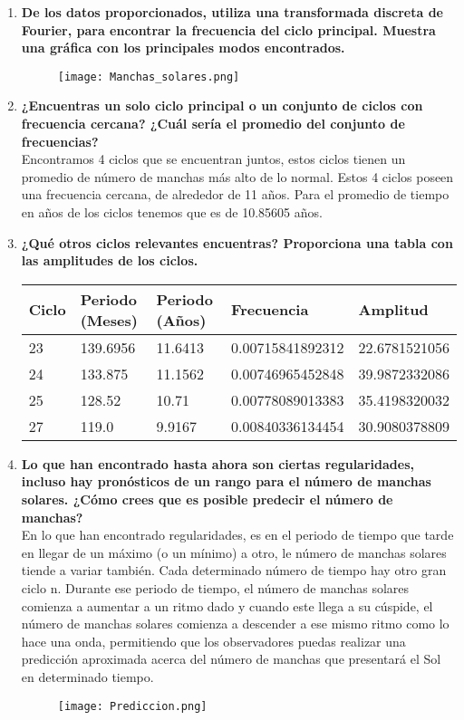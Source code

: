 \documentclass{article}
\begin{document}
\pagebreak
\onehalfspacing
\begin{enumerate}
\item \textbf{De los datos proporcionados, utiliza una transformada discreta de Fourier, para encontrar la frecuencia del ciclo principal. Muestra una gráfica con los principales modos encontrados.}
\begin{figure}[h]
\centering
\texttt{[image: Manchas\_solares.png]}
\end{figure}

\item \textbf{¿Encuentras un solo ciclo principal o un conjunto de ciclos con frecuencia cercana? ¿Cuál sería el promedio del conjunto de frecuencias?}\\
Encontramos 4 ciclos que se encuentran juntos, estos ciclos tienen un promedio de número de manchas más alto de lo normal. Estos 4 ciclos poseen una frecuencia cercana, de alrededor de 11 años. Para el promedio de tiempo en años de los ciclos tenemos que es de 10.85605 años. \\

\item \textbf{¿Qué otros ciclos relevantes encuentras? Proporciona una tabla con las amplitudes de los ciclos.}\\
\begin{table}[h]
\centering
\label{my-label}
\begin{tabular}{|l|l|l|l|l|}
\hline
Ciclo & Periodo (Meses) & Periodo (Años) & Frecuencia       & Amplitud      \\ \hline
23    & 139.6956        & 11.6413        & 0.00715841892312 & 22.6781521056 \\ \hline
24    & 133.875         & 11.1562        & 0.00746965452848 & 39.9872332086 \\ \hline
25    & 128.52          & 10.71          & 0.00778089013383 & 35.4198320032 \\ \hline
27    & 119.0           & 9.9167         & 0.00840336134454 & 30.9080378809 \\ \hline
\end{tabular}
\end{table}

\item \textbf{Lo que han encontrado hasta ahora son ciertas regularidades, incluso hay pronósticos de un rango para el número de manchas solares. ¿Cómo crees que es posible predecir el número de manchas?}\\
En lo que han encontrado regularidades, es en el periodo de tiempo que tarde en llegar de un máximo (o un mínimo) a otro, le número de manchas solares tiende a variar también. Cada determinado número de tiempo hay otro gran ciclo n. Durante ese periodo de tiempo, el número de manchas solares comienza a aumentar a un ritmo dado y cuando este llega a su cúspide, el número de manchas solares comienza a descender a ese mismo ritmo como lo hace una onda, permitiendo que los observadores puedas realizar una predicción aproximada acerca del número de manchas que presentará el Sol en determinado tiempo.
\begin{figure}[h]
\texttt{[image: Prediccion.png]}
\end{figure}
\end{enumerate}
\end{document}
